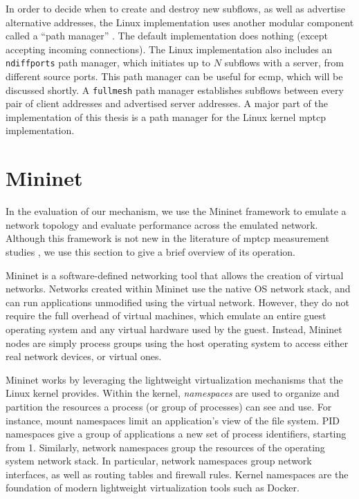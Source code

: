 \documentclass{cwru}
\begin{document}
In order to decide when to create and destroy new subflows, as well as advertise
alternative addresses, the Linux implementation uses another modular component
called a ``path manager'' \cite{mptcp}. The default implementation does nothing
(except accepting incoming connections). The Linux implementation also includes
an \texttt{ndiffports} path manager, which initiates up to $N$ subflows with a
server, from different source ports. This path manager can be useful for
\ac{ecmp}, which will be discussed shortly. A \texttt{fullmesh} path manager
establishes subflows between every pair of client addresses and advertised
server addresses. A major part of the implementation of this thesis is a path
manager for the Linux kernel \ac{mptcp} implementation.


\section{Mininet}

In the evaluation of our mechanism, we use the Mininet \cite{mininet} framework
to emulate a network topology and evaluate performance across the emulated
network. Although this framework is not new in the literature of \ac{mptcp}
measurement studies \cite{paasch2013benefits,paasch2014experimental}, we use
this section to give a brief overview of its operation.

Mininet is a software-defined networking tool that allows the creation of
virtual networks. Networks created within Mininet use the native OS network
stack, and can run applications unmodified using the virtual network. However,
they do not require the full overhead of virtual machines, which emulate an
entire guest operating system and any virtual hardware used by the guest.
Instead, Mininet nodes are simply process groups using the host operating system
to access either real network devices, or virtual ones.

Mininet works by leveraging the lightweight virtualization mechanisms that the
Linux kernel provides. Within the kernel, \emph{namespaces} are used to organize
and partition the resources a process (or group of processes) can see and use.
For instance, mount namespaces limit an application's view of the file system.
PID namespaces give a group of applications a new set of process identifiers,
starting from 1. Similarly, network namespaces group the resources of the
operating system network stack. In particular, network namespaces group network
interfaces, as well as routing tables and firewall rules. Kernel namespaces are
the foundation of modern lightweight virtualization tools such as Docker.
\end{document}
